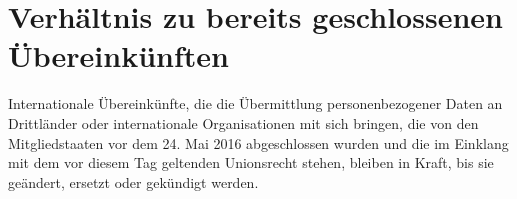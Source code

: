 \chapter{Verhältnis zu bereits geschlossenen Übereinkünften}
\label{ch:96}


Internationale Übereinkünfte, die die Übermittlung personenbezogener Daten an Drittländer oder internationale
Organisationen mit sich bringen, die von den Mitgliedstaaten vor dem 24. Mai 2016 abgeschlossen wurden und die im
Einklang mit dem vor diesem Tag geltenden Unionsrecht stehen, bleiben in Kraft, bis sie geändert, ersetzt oder
gekündigt werden.


